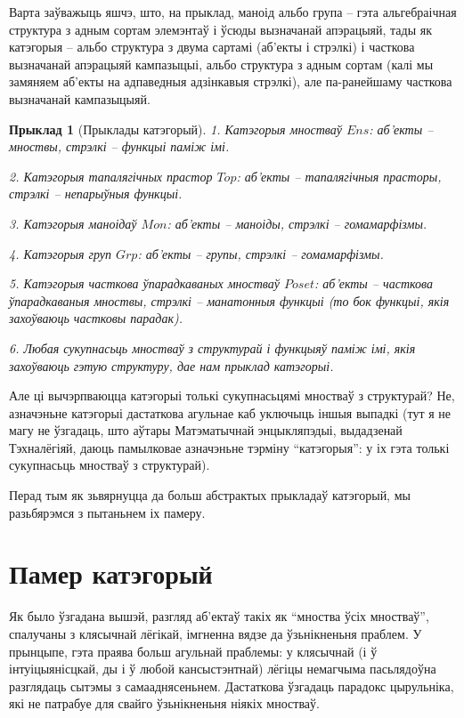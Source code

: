 \documentclass[a4paper,12pt]{book}
\newtheorem{example}{Прыклад}[section]
\begin{document}
Варта заўважыць яшчэ, што, на прыклад, маноід альбо
група -- гэта альгебраічная структура з адным сортам
элемэнтаў і ўсюды вызначанай апэрацыяй, тады як катэгорыя -- альбо
структура з двума сартамі (аб'екты і стрэлкі) і часткова вызначанай
апэрацыяй кампазыцыі, альбо структура з адным сортам (калі мы замяняем
аб'екты на адпаведныя адзінкавыя стрэлкі), але па-ранейшаму часткова
вызначанай кампазыцыяй.

\begin{example}[Прыклады катэгорый]
  1. Катэгорыя мностваў $Ens$: аб'екты -- мноствы, стрэлкі -- функцыі
  паміж імі.

  2. Катэгорыя тапалягічных прастор $Top$: аб'екты -- тапалягічныя
  прасторы, стрэлкі -- непарыўныя функцыі.

  3. Катэгорыя маноідаў $Mon$: аб'екты -- маноіды, стрэлкі --
  гомамарфізмы.

  4. Катэгорыя груп $Grp$: аб'екты -- групы, стрэлкі -- гомамарфізмы.

  5. Катэгорыя часткова ўпарадкаваных мностваў $Poset$: аб'екты --
  часткова ўпарадкаваныя мноствы, стрэлкі -- манатонныя функцыі (то
  бок функцыі, якія захоўваюць частковы парадак).

  6. Любая сукупнасьць мностваў з структурай і функцыяў паміж імі,
  якія захоўваюць гэтую структуру, дае нам прыклад катэгорыі.
\end{example}

Але ці вычэрпваюцца катэгорыі толькі сукупнасьцямі мностваў з
структурай? Не, азначэньне катэгорыі дастаткова агульнае каб уключыць
іншыя выпадкі (тут я не магу не ўзгадаць, што аўтары Матэматычнай
энцыкляпэдыі, выдадзенай Тэхналёгіяй, даюць памылковае азначэньне
тэрміну ``катэгорыя'': у іх гэта толькі сукупнасьць мностваў з
структурай).

Перад тым як зьвярнуцца да больш абстрактых прыкладаў катэгорый, мы
разьбярэмся з пытаньнем іх памеру.

\section{Памер катэгорый}

Як было ўзгадана вышэй, разгляд аб'ектаў такіх як ``мноства ўсіх
мностваў'', спалучаны з клясычнай лёгікай, імгненна вядзе да
ўзьнікненьня праблем. У прынцыпе, гэта праява больш агульнай праблемы:
у клясычнай (і ў інтуіцыянісцкай, ды і ў любой кансыстэнтнай) лёгіцы
немагчыма пасьлядоўна разглядаць сытэмы з самааднясеньнем. Дастаткова
ўзгадаць парадокс цырульніка, які не патрабуе для свайго ўзьнікненьня
ніякіх мностваў.
\end{document}
